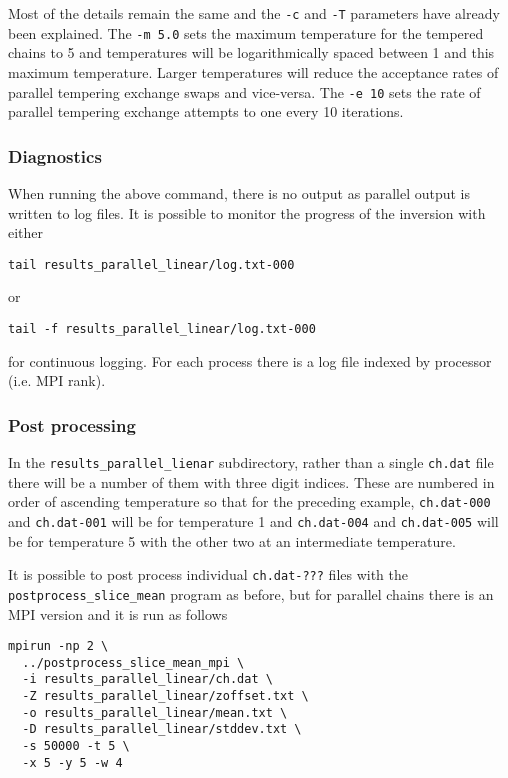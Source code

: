 \documentclass[a4paper,12pt]{article}
\begin{document}
Most of the details remain the same and the {\tt -c} and {\tt -T} parameters have
already been explained. The {\tt -m 5.0} sets the maximum temperature for the
tempered chains to 5 and temperatures will be logarithmically spaced between 1
and this maximum temperature. Larger temperatures will reduce the acceptance
rates of parallel tempering exchange swaps and vice-versa. The {\tt -e 10}
sets the rate of parallel tempering exchange attempts to one every 10 iterations.

\subsubsection{Diagnostics}

When running the above command, there is no output as parallel output is
written to log files. It is possible to monitor the progress of the inversion
with either

\begin{verbatim}
tail results_parallel_linear/log.txt-000
\end{verbatim}

or

\begin{verbatim}
tail -f results_parallel_linear/log.txt-000
\end{verbatim}

for continuous logging. For each process there is a log file indexed by processor
(i.e. MPI rank).


\subsubsection{Post processing}

In the {\tt results\_parallel\_lienar} subdirectory, rather than
a single {\tt ch.dat} file there will be a number of them with
three digit indices. These are numbered in order of ascending
temperature so that for the preceding example, {\tt ch.dat-000}
and {\tt ch.dat-001} will be for temperature 1 and
{\tt ch.dat-004} and {\tt ch.dat-005} will be for temperature
5 with the other two at an intermediate temperature.

It is possible to post process individual {\tt ch.dat-???} files
with the {\tt postprocess\_slice\_mean} program as before, but
for parallel chains there is an MPI version and it is run as
follows

\begin{verbatim}
mpirun -np 2 \
  ../postprocess_slice_mean_mpi \
  -i results_parallel_linear/ch.dat \
  -Z results_parallel_linear/zoffset.txt \
  -o results_parallel_linear/mean.txt \
  -D results_parallel_linear/stddev.txt \
  -s 50000 -t 5 \
  -x 5 -y 5 -w 4
\end{verbatim}
\end{document}
